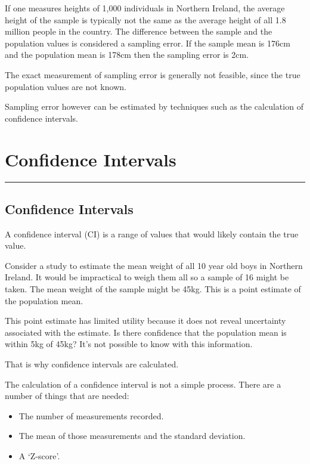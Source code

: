 \documentclass[
]{book}
\providecommand{\tightlist}{%
  \setlength{\itemsep}{0pt}\setlength{\parskip}{0pt}}
\begin{document}
If one measures heights of 1,000 individuals in Northern Ireland, the average height of the sample is typically not the same as the average height of all 1.8 million people in the country. The difference between the sample and the population values is considered a sampling error. If the sample mean is 176cm and the population mean is 178cm then the sampling error is 2cm.

The exact measurement of sampling error is generally not feasible, since the true population values are not known.

Sampling error however can be estimated by techniques such as the calculation of confidence intervals.

\hypertarget{confidence-intervals}{%
\chapter{Confidence Intervals}\label{confidence-intervals}}

\begin{center}\rule{0.5\linewidth}{0.5pt}\end{center}

\hypertarget{confidence-intervals-1}{%
\section{Confidence Intervals}\label{confidence-intervals-1}}

A confidence interval (CI) is a range of values that would likely contain the true value.

Consider a study to estimate the mean weight of all 10 year old boys in Northern Ireland. It would be impractical to weigh them all so a sample of 16 might be taken. The mean weight of the sample might be 45kg. This is a point estimate of the population mean.

This point estimate has limited utility because it does not reveal uncertainty associated with the estimate. Is there confidence that the population mean is within 5kg of 45kg? It's not possible to know with this information.

That is why confidence intervals are calculated.

The calculation of a confidence interval is not a simple process. There are a number of things that are needed:

\begin{itemize}
\tightlist
\item
  The number of measurements recorded.
\item
  The mean of those measurements and the standard deviation.
\item
  A `Z-score'.
\end{itemize}
\end{document}
